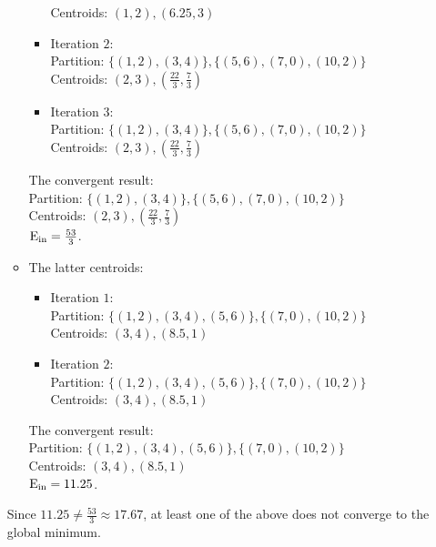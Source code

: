 \begin{pr}
\begin{enumerate}[(A)]
\begin{itemize}
\begin{itemize}
Centroids: $(1, 2), (6.25, 3)$
\item Iteration $2$:\\
Partition: $\{(1, 2), (3, 4)\}, \{(5, 6), (7, 0), (10, 2)\}$\\
Centroids: $(2, 3), (\frac{22}3, \frac73)$
\item Iteration $3$:\\
Partition: $\{(1, 2), (3, 4)\}, \{(5, 6), (7, 0), (10, 2)\}$\\
Centroids: $(2, 3), (\frac{22}3, \frac73)$
\end{itemize}
The convergent result:\\
Partition: $\{(1, 2), (3, 4)\}, \{(5, 6), (7, 0), (10, 2)\}$\\
Centroids: $(2, 3), (\frac{22}3, \frac73)$\\
$\mathrm{E_{in}}=\frac{53}3$.
\item The latter centroids:
\begin{itemize}
\item Iteration $1$:\\
Partition: $\{(1, 2), (3, 4), (5, 6)\}, \{(7, 0), (10, 2)\}$\\
Centroids: $(3, 4), (8.5, 1)$
\item Iteration $2$:\\
Partition: $\{(1, 2), (3, 4), (5, 6)\}, \{(7, 0), (10, 2)\}$\\
Centroids: $(3, 4), (8.5, 1)$
\end{itemize}
The convergent result:\\
Partition: $\{(1, 2), (3, 4), (5, 6)\}, \{(7, 0), (10, 2)\}$\\
Centroids: $(3, 4), (8.5, 1)$\\
$\mathrm{E_{in}}=11.25$.
\end{itemize}
Since $11.25\neq\frac{53}3\approx17.67$, at least one of the above does not converge to the global minimum.
\end{enumerate}
\end{pr}
